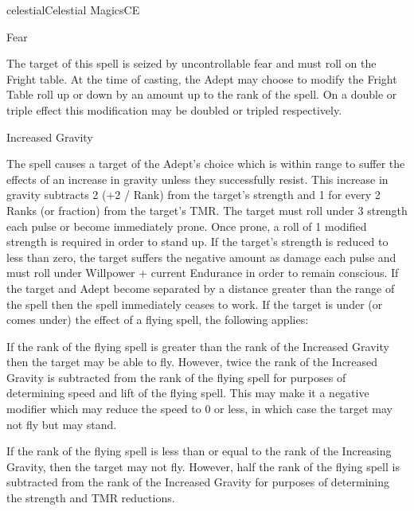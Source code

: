 \begin{college}[1.3]{celestial}{Celestial Magics}{CE}
\begin{spell}[S-7]{Fear}

\begin{effects}
The target of this spell is seized by uncontrollable fear and must
roll on the Fright table. At the time of casting, the Adept may choose
to modify the Fright Table roll up or down by an amount up to the rank
of the spell.  On a double or triple effect this modification may be
doubled or tripled respectively.
\end{effects}
\end{spell}

\begin{spell}[S-8]{Increased Gravity}

\begin{effects}
The spell causes a target of the Adept's choice which is within range
to suffer the effects of an increase in gravity unless they
successfully resist.  This increase in gravity subtracts 2 (+2 / Rank)
from the target's strength and 1 for every 2 Ranks (or fraction) from
the target's TMR.  The target must roll under 3 \x strength each pulse
or become immediately prone.  Once prone, a roll of 1 \x modified
strength is required in order to stand up.  If the target's strength
is reduced to less than zero, the target suffers the negative amount as
damage each pulse and must roll under Willpower + current Endurance in
order to remain conscious.  If the target and Adept become separated
by a distance greater than the range of the spell then the spell
immediately ceases to work.  If the target is under (or comes under)
the effect of a flying spell, the following applies:
\begin{Itemize}
\item If the rank of the flying spell is greater than the rank of the
Increased Gravity then the target may be able to fly.  However,
twice the rank of the Increased Gravity is subtracted from the rank
of the flying spell for purposes of determining speed and lift of the
flying spell.  This may make it a negative modifier which may reduce
the speed to 0 or less, in which case the target may not fly but may
stand.
\item If the rank of the flying spell is less than or equal to the
rank of the Increasing Gravity, then the target may not fly.  However,
half the rank of the flying spell is subtracted from the rank of the
Increased Gravity for purposes of determining the strength and TMR
reductions.
\end{Itemize}
\end{effects}
\end{spell}


\end{college}

